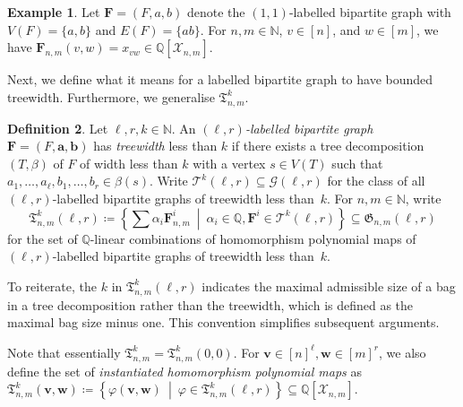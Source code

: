\documentclass[11pt, DIV=15]{scrarticle}
\theoremstyle{definition}
\newtheorem{definition}{Definition}[section]
\newtheorem{example}[definition]{Example}
\theoremstyle{plain}
\theoremstyle{remark}
\renewcommand{\phi}{\varphi}
\begin{document}
	\begin{example}\label{ex:edge}
		Let $\boldsymbol{F} = (F, a, b)$ denote the $(1,1)$-labelled bipartite graph with $V(F) = \{a,b\}$ and $E(F) = \{ab\}$.
		For $n,m \in \mathbb{N}$, $v \in [n]$, and $w \in [m]$,
		we have $\boldsymbol{F}_{n,m}(v, w) = x_{vw} \in \mathbb{Q}[\mathcal{X}_{n,m}]$.
	\end{example}
	
	Next, we define what it means for a labelled bipartite graph to have bounded treewidth.
	Furthermore, we generalise $\mathfrak{T}^k_{n,m}$.


	\begin{definition}\label{def:treewidth-labelled}
		Let $\ell, r, k \in \mathbb{N}$.
		An \emph{$(\ell, r)$-labelled bipartite graph} $\boldsymbol{F} = (F, \boldsymbol{a}, \boldsymbol{b})$ has \emph{treewidth} less than $k$ if there exists a tree decomposition $(T, \beta)$ of $F$ of width less than $k$ with a vertex $s \in V(T)$ such that $a_1, \dots, a_\ell, b_1, \dots, b_r \in \beta(s)$.
		Write $\mathcal{T}^k(\ell, r) \subseteq \mathcal{G}(\ell, r)$ for the class of all $(\ell, r)$-labelled bipartite graphs of treewidth less than~$k$.
		For $n,m \in \mathbb{N}$, write
		\[
			\mathfrak{T}_{n,m}^k(\ell, r) \coloneqq \left\{\sum \alpha_i \boldsymbol{F}^i_{n,m} \ \middle|\  \alpha_i \in \mathbb{Q}, \boldsymbol{F}^i \in \mathcal{T}^k(\ell, r)\right\}
			\subseteq \mathfrak{G}_{n,m}(\ell, r)
		\]
		for the set of $\mathbb{Q}$-linear combinations of homomorphism polynomial maps of $(\ell,r)$-labelled bipartite graphs of treewidth less than~$k$.
	\end{definition}
	
	To reiterate, the $k$ in $\mathfrak{T}_{n,m}^k(\ell, r)$ indicates the maximal admissible size of a bag in a tree decomposition rather than the treewidth, which is defined as the maximal bag size minus one.
	This convention simplifies subsequent arguments.
	


	Note that essentially $\mathfrak{T}^k_{n,m} = \mathfrak{T}^k_{n,m}(0,0)$. For $\boldsymbol{v} \in [n]^\ell, \boldsymbol{w} \in [m]^r$, we also define the set of \emph{instantiated homomorphism polynomial maps} as  
	\(
	\mathfrak{T}_{n,m}^k(\boldsymbol{v},\boldsymbol{w}) \coloneqq \left\{ \phi(\boldsymbol{v}, \boldsymbol{w}) \ \middle|\  \phi \in \mathfrak{T}^k_{n,m}(\ell,r) \right\} \subseteq \mathbb{Q}[\mathcal{X}_{n,m}].
	\)
	
	
\end{document}
